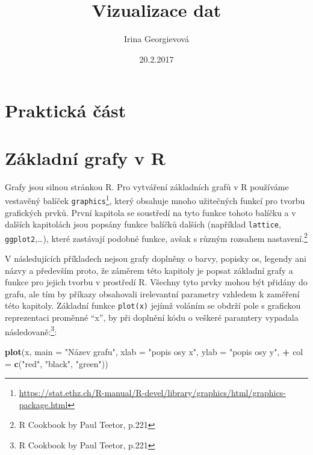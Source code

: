 \documentclass[]{article}
\title{Vizualizace dat}
\author{Irina Georgievová}
\date{20.2.2017}
\newenvironment{Shaded}{\begin{snugshade}}{\end{snugshade}}
\newcommand{\KeywordTok}[1]{\textcolor[rgb]{0.13,0.29,0.53}{\textbf{#1}}}
\newcommand{\DataTypeTok}[1]{\textcolor[rgb]{0.13,0.29,0.53}{#1}}
\newcommand{\StringTok}[1]{\textcolor[rgb]{0.31,0.60,0.02}{#1}}
\newcommand{\OperatorTok}[1]{\textcolor[rgb]{0.81,0.36,0.00}{\textbf{#1}}}
\newcommand{\NormalTok}[1]{#1}
\let\rmarkdownfootnote\footnote%
\def\footnote{\protect\rmarkdownfootnote}
\theoremstyle{definition}
\theoremstyle{definition}
\theoremstyle{remark}
\begin{document}
\maketitle

{
\setcounter{tocdepth}{2}
\tableofcontents
}
\section*{Praktická část}\label{prakticka-cast}

\section*{Základní grafy v R}\label{zakladni-grafy-v-r}

Grafy jsou silnou stránkou R. Pro vytváření základních grafů v R
používáme vestavěný balíček \texttt{graphics}\footnote{\url{https://stat.ethz.ch/R-manual/R-devel/library/graphics/html/graphics-package.html}},
který obsahuje mnoho užitečných funkcí pro tvorbu grafických prvků.
První kapitola se soustředí na tyto funkce tohoto balíčku a v dalších
kapitolách jsou popsány funkce balíčků dalších (například
\texttt{lattice}, \texttt{ggplot2},\ldots{}), které zastávají podobné
funkce, avšak s různým rozsahem nastavení.\footnote{R Cookbook by Paul
  Teetor, p.221}

V následujících příkladech nejsou grafy doplněny o barvy, popisky os,
legendy ani názvy a především proto, že záměrem této kapitoly je popsat
základní grafy a funkce pro jejich tvorbu v prostředí R. Všechny tyto
prvky mohou být přidány do grafu, ale tím by příkazy obsahovali
irelevantní parametry vzhledem k zaměření této kapitoly. Základní funkce
\texttt{plot(x)} jejímž voláním se obdrží pole s grafickou reprezentaci
proměnné ``x'', by při doplnění kódu o veškeré paramtery vypadala
následovaně:\footnote{R Cookbook by Paul Teetor, p.221}:

\begin{Shaded}
\begin{Highlighting}[]
\KeywordTok{plot}\NormalTok{(x, }\DataTypeTok{main =} \StringTok{"Název grafu"}\NormalTok{, }\DataTypeTok{xlab =} \StringTok{"popis osy x"}\NormalTok{, }\DataTypeTok{ylab =} \StringTok{"popis osy y"}\NormalTok{, }
\OperatorTok{+}\StringTok{    }\DataTypeTok{col =} \KeywordTok{c}\NormalTok{(}\StringTok{"red"}\NormalTok{, }\StringTok{"black"}\NormalTok{, }\StringTok{"green"}\NormalTok{)) }
\end{Highlighting}
\end{Shaded}
\end{document}
